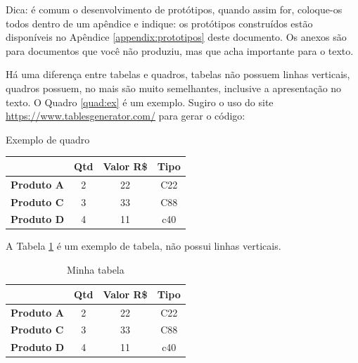 Dica: é comum o desenvolvimento de protótipos, quando assim for, coloque-os todos dentro de um apêndice e indique: os protótipos construídos estão disponíveis no Apêndice \ref{appendix:prototipos} deste documento. Os anexos são para documentos que você não produziu, mas que acha importante para o texto.

\newpage

Há uma diferença entre tabelas e quadros, tabelas não possuem linhas verticais, quadros possuem, no mais são muito semelhantes, inclusive a apresentação no texto. O Quadro \ref{quad:ex} é um exemplo. Sugiro o uso do site \url{https://www.tablesgenerator.com/} para gerar o código:



\begin{quadro}
\caption{Exemplo de quadro}
\label{quad:ex}
\centering
\begin{tabular}{|l|c|c|c|}
\hline
\multicolumn{1}{|c|}{} & \multicolumn{1}{l|}{\textbf{Qtd}} & \multicolumn{1}{l|}{\textbf{Valor R\$}} & \multicolumn{1}{l|}{\textbf{Tipo}} \\ \hline
\rowcolor[HTML]{FFCC67} 
\textbf{Produto A}     & 2                                 & 22                                      & C22                                \\ \hline
\textbf{Produto C}     & 3                                 & 33                                      & C88                                \\ \hline
\textbf{Produto D}     & 4                                 & 11                                      & c40                                \\ \hline
\end{tabular}
\end{quadro}


A Tabela \ref{tab:ex} é um exemplo de tabela, não possui linhas verticais.



\begin{table}[h]%
\caption{Minha tabela}
\label{tab:ex}
\centering
\begin{tabular}{lccc}
\hline
\multicolumn{1}{c}{} & \multicolumn{1}{l}{\textbf{Qtd}} & \multicolumn{1}{l}{\textbf{Valor R\$}} & \multicolumn{1}{l}{\textbf{Tipo}} \\ \hline
\rowcolor[HTML]{FFCC67} 
\textbf{Produto A}     & 2                                 & 22                                      & C22                                \\ \hline
\textbf{Produto C}     & 3                                 & 33                                      & C88                                \\ \hline
\textbf{Produto D}     & 4                                 & 11                                      & c40                                \\ \hline
\end{tabular}
\end{table}


